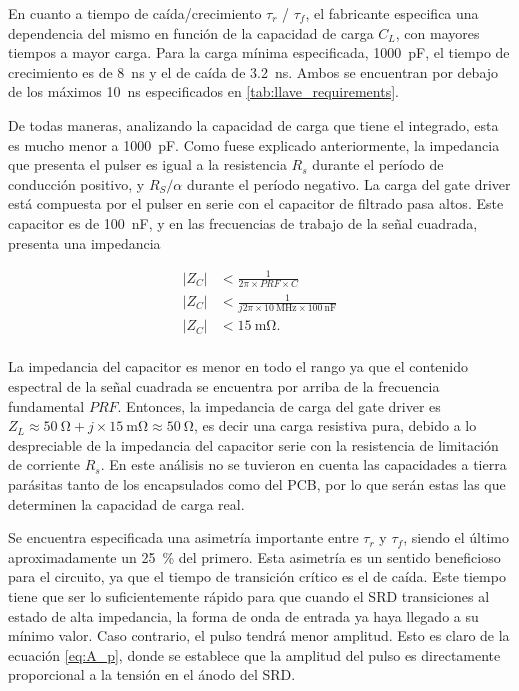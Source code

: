 En cuanto a tiempo de caída/crecimiento $\tau_{r}$ / $\tau_{f}$, el fabricante
especifica una dependencia del mismo en función de la capacidad de carga $C_L$,
con mayores tiempos a mayor carga. Para la carga mínima especificada,
\qty{1000}{\pico\farad}, el tiempo de crecimiento es de \qty{8}{\nano\second} y
el de caída de \qty{3.2}{\nano\second}. Ambos se encuentran por debajo de los
máximos \qty{10}{\nano\second} especificados en \ref{tab:llave_requirements}.

De todas maneras, analizando la capacidad de carga que tiene el integrado, esta
es mucho menor a \qty{1000}{\pico\farad}. Como fuese explicado anteriormente, la
impedancia que presenta el pulser es igual a la resistencia $R_s$ durante el
período de conducción positivo, y $R_S/\alpha$ durante el período negativo. La
carga del gate driver está compuesta por el pulser en serie con el capacitor de
filtrado pasa altos. Este capacitor es de \qty{100}{\nano\farad}, y en las
frecuencias de trabajo de la señal cuadrada, presenta una impedancia

\begin{equation}
    \begin{aligned}
        | Z_C | &< \frac{1}{2\pi \times PRF \times C} \\
        | Z_C | &< \frac{1}{j2\pi \times \qty{10}{\mega\hertz} \times
        \qty{100}{\nano\farad}} \\
        | Z_C | &< \qty{15}{\milli\ohm}. \\
    \end{aligned}
\end{equation}

La impedancia del capacitor es menor en todo el rango ya que el contenido
espectral de la señal cuadrada se encuentra por arriba de la frecuencia
fundamental $PRF$. Entonces, la impedancia de carga del gate driver es $Z_L
\approx \qty{50}{\ohm} + j \times \qty{15}{\milli\ohm} \approx \qty{50}{\ohm}$,
es decir una carga resistiva pura, debido a lo despreciable de la impedancia del
capacitor serie con la resistencia de limitación de corriente $R_s$. En este
análisis no se tuvieron en cuenta las capacidades a tierra parásitas tanto de
los encapsulados como del PCB, por lo que serán estas las que determinen la
capacidad de carga real.

Se encuentra especificada una asimetría importante entre $\tau_r$ y $\tau_f$,
siendo el último aproximadamente un \qty{25}{\percent} del primero. Esta
asimetría es un sentido beneficioso para el circuito, ya que el tiempo de
transición crítico es el de caída. Este tiempo tiene que ser lo suficientemente
rápido para que cuando el SRD transiciones al estado de alta impedancia, la forma
de onda de entrada ya haya llegado a su mínimo valor. Caso contrario, el pulso
tendrá menor amplitud. Esto es claro de la ecuación \ref{eq:A_p}, donde se
establece que la amplitud del pulso es directamente proporcional a la tensión en
el ánodo del SRD.

